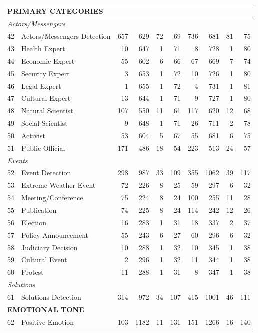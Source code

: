 {\begin{longtable}{p{0.5cm}p{5.5cm}rrrrrrrr}
\multicolumn{10}{l}{\cellcolor{gray!10}\textbf{PRIMARY CATEGORIES}} \\
\midrule
\multicolumn{10}{l}{\textit{Actors/Messengers}} \\
42 & Actors/Messengers Detection & 657 & 629 & 72 & 69 & 736 & 681 & 81 & 75 \\
43 & Health Expert & 10 & 647 & 1 & 71 & 8 & 728 & 1 & 80 \\
44 & Economic Expert & 55 & 602 & 6 & 66 & 67 & 669 & 7 & 74 \\
45 & Security Expert & 3 & 653 & 1 & 72 & 10 & 726 & 1 & 80 \\
46 & Legal Expert & 1 & 655 & 1 & 72 & 4 & 731 & 1 & 81 \\
47 & Cultural Expert & 13 & 644 & 1 & 71 & 9 & 727 & 1 & 80 \\
48 & Natural Scientist & 107 & 550 & 11 & 61 & 117 & 620 & 12 & 68 \\
49 & Social Scientist & 9 & 648 & 1 & 71 & 26 & 711 & 2 & 78 \\
50 & Activist & 53 & 604 & 5 & 67 & 55 & 681 & 6 & 75 \\
51 & Public Official & 171 & 486 & 18 & 54 & 223 & 513 & 24 & 57 \\
\multicolumn{10}{l}{\textit{Events}} \\
52 & Event Detection & 298 & 987 & 33 & 109 & 355 & 1062 & 39 & 117 \\
53 & Extreme Weather Event & 72 & 226 & 8 & 25 & 59 & 297 & 6 & 32 \\
54 & Meeting/Conference & 75 & 224 & 8 & 24 & 100 & 255 & 11 & 28 \\
55 & Publication & 74 & 225 & 8 & 24 & 114 & 242 & 12 & 26 \\
56 & Election & 16 & 283 & 1 & 31 & 18 & 337 & 2 & 37 \\
57 & Policy Announcement & 55 & 243 & 6 & 27 & 60 & 296 & 6 & 32 \\
58 & Judiciary Decision & 10 & 288 & 1 & 32 & 10 & 345 & 1 & 38 \\
59 & Cultural Event & 2 & 296 & 1 & 32 & 11 & 344 & 1 & 38 \\
60 & Protest & 11 & 288 & 1 & 31 & 8 & 347 & 1 & 38 \\
\multicolumn{10}{l}{\textit{Solutions}} \\
61 & Solutions Detection & 314 & 972 & 34 & 107 & 415 & 1001 & 46 & 111 \\
\multicolumn{10}{l}{\cellcolor{gray!10}\textbf{EMOTIONAL TONE}} \\
\midrule
62 & Positive Emotion & 103 & 1182 & 11 & 131 & 151 & 1266 & 16 & 140 \\

\end{longtable}}
